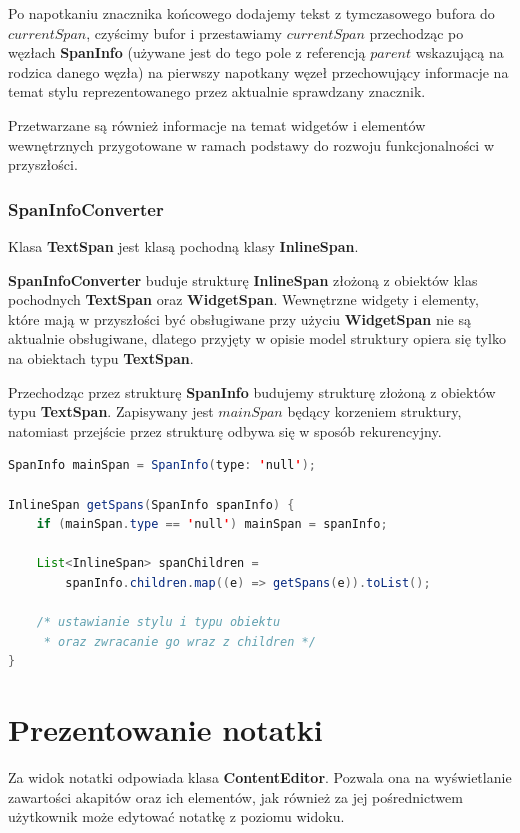 Po napotkaniu znacznika końcowego dodajemy tekst z tymczasowego bufora do $currentSpan$, czyścimy bufor i przestawiamy $currentSpan$ przechodząc po węzłach \textbf{SpanInfo} (używane jest do tego pole z referencją $parent$ wskazującą na rodzica danego węzła) na pierwszy napotkany węzeł przechowujący informacje na temat stylu reprezentowanego przez aktualnie sprawdzany znacznik.

Przetwarzane są również informacje na temat widgetów i elementów wewnętrznych przygotowane w ramach podstawy do rozwoju funkcjonalności w przyszłości.

\subsubsection{SpanInfoConverter}

Klasa \textbf{TextSpan} jest klasą pochodną klasy \textbf{InlineSpan}.

\textbf{SpanInfoConverter} buduje strukturę \textbf{InlineSpan} złożoną z obiektów klas pochodnych \textbf{TextSpan} oraz \textbf{WidgetSpan}. Wewnętrzne widgety i elementy, które mają w przyszłości być obsługiwane przy użyciu \textbf{WidgetSpan} nie są aktualnie obsługiwane, dlatego przyjęty w opisie model struktury opiera się tylko na obiektach typu \textbf{TextSpan}.

Przechodząc przez strukturę \textbf{SpanInfo} budujemy strukturę złożoną z obiektów typu \textbf{TextSpan}. Zapisywany jest $mainSpan$ będący korzeniem struktury, natomiast przejście przez strukturę odbywa się w sposób rekurencyjny.

\begin{lstlisting}[language=Java]
SpanInfo mainSpan = SpanInfo(type: 'null');

InlineSpan getSpans(SpanInfo spanInfo) {
    if (mainSpan.type == 'null') mainSpan = spanInfo;

    List<InlineSpan> spanChildren =
        spanInfo.children.map((e) => getSpans(e)).toList();

    /* ustawianie stylu i typu obiektu 
     * oraz zwracanie go wraz z children */
}
\end{lstlisting}

\newpage

\section{Prezentowanie notatki}

Za widok notatki odpowiada klasa \textbf{ContentEditor}. Pozwala ona na wyświetlanie zawartości akapitów oraz ich elementów, jak również za jej pośrednictwem użytkownik może edytować notatkę z poziomu widoku.

